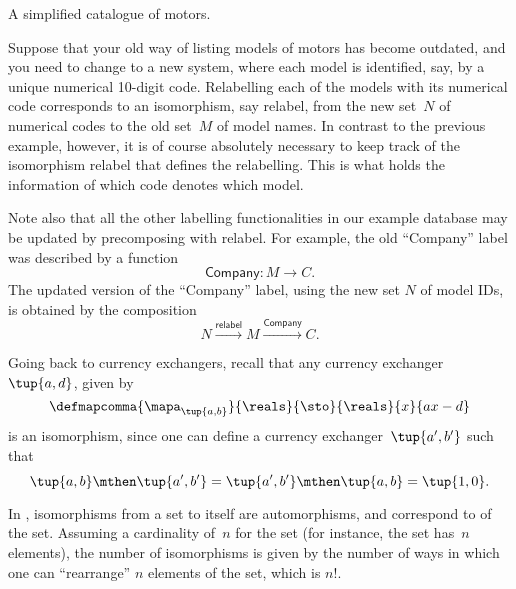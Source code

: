 \begin{example}[Relabelling]
\begin{table*}[h]
        \caption{
            A simplified catalogue of motors.
        }
        \label{tab:electric_motors}
    \end{table*}
    Suppose that your old way of listing models of motors has become outdated, and you need to change to a new system, where each model is identified, say, by a unique numerical 10-digit code.
    Relabelling each of the models with its numerical code corresponds to an isomorphism, say \textsf{relabel}, from the new set~$N$ of numerical codes to the old set~$M$ of model names.
    In contrast to the previous example, however, it is of course absolutely necessary to keep track of the isomorphism \textsf{relabel} that defines the relabelling.
    This is what holds the information of which code denotes which model.

    Note also that all the other labelling functionalities in our example database may be updated by precomposing with \textsf{relabel}.
    For example, the old ``Company'' label was described by a function
    \begin{equation}
        \textsf{Company}\colon M \to C.
    \end{equation}
    The updated version of the ``Company'' label, using the new set $N$ of model IDs, is obtained by the composition
    \begin{equation}
        N \overset{\textsf{relabel}}{\longrightarrow} M \overset{\textsf{Company}}{\longrightarrow} C.
    \end{equation}
\end{example}

\begin{example}
    Going back to currency exchangers, recall that any currency exchanger~$\tup{a,d}$, given by
    \begin{equation}
        \defmapcomma{\mapa_{\tup{a,b}}}{\reals}{\sto}{\reals}{x}{ax-d}
    \end{equation}
    is an isomorphism, since one can define a currency exchanger~$\tup{a',b'}$ such that
    \begin{equation}
        \tup{a,b}\mthen \tup{a',b'}=\tup{a',b'}\mthen \tup{a,b}=\tup{1,0}.
    \end{equation}
\end{example}

\begin{example}
    In \FinSet, isomorphisms from a set to itself are automorphisms, and correspond to \emph{} of the set.
    Assuming a cardinality of~$n$ for the set (for instance, the set has~$n$ elements), the number of isomorphisms is given by the number of ways in which one can ``rearrange'' $n$ elements of the set, which is $n!
    $.
\end{example}

